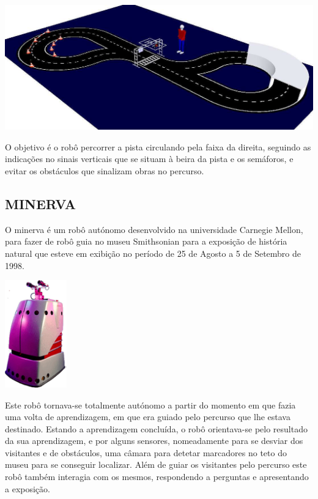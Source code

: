 \begin{center}
	\includegraphics[width=1.00\textwidth]{./figures/ca_pista.png}
	\label{fig:3}
\end{center}

O objetivo é o robô percorrer a pista circulando pela faixa da direita, seguindo
as indicações no sinais verticais que se situam à beira da pista e os semáforos,
e evitar os obstáculos que sinalizam obras no percurso.


\subsection{MINERVA}
O minerva é um robô autónomo desenvolvido na universidade Carnegie Mellon, para
fazer de robô guia no museu Smithsonian para a exposição de história natural que esteve em exibição no período de 25 de Agosto a 5 de Setembro de 1998.

\begin{center}
	\includegraphics[width=0.20\textwidth]{./figures/minerva.png}
	\label{fig:4}
\end{center}

Este robô tornava-se totalmente autónomo a partir do momento em que fazia uma volta de aprendizagem, em que era guiado pelo percurso que lhe estava destinado. Estando a aprendizagem concluída, o robô orientava-se pelo resultado da sua aprendizagem, e por alguns sensores, nomeadamente para se desviar dos visitantes e de obstáculos, uma câmara para detetar marcadores no teto do museu para se conseguir localizar.
Além de guiar os visitantes pelo percurso este robô também interagia com os mesmos, respondendo a perguntas e apresentando a exposição.

